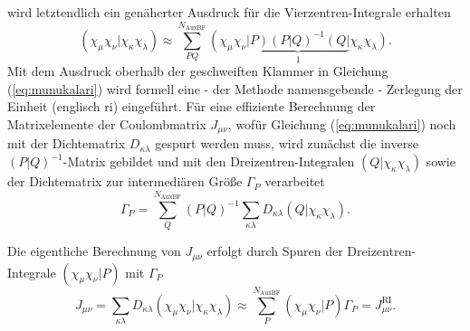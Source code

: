 	wird letztendlich ein genäherter Ausdruck für die Vierzentren-Integrale erhalten	
	\begin{equation}\label{eq:munukalari}
	\left(\chi_\mu\chi_\nu\vert\chi_\kappa\chi_\lambda\right)\approx\sum_{PQ}^{N_{\textrm{AuxBF}}}\left(\chi_\mu\chi_\nu\right.\underbrace{\left.\vert P\right)\left(P\vert Q\right)^{-1}\left(Q\vert\right.}_{1}\left.\chi_\kappa\chi_\lambda\right).		
	\end{equation}
	Mit dem Ausdruck oberhalb der geschweiften Klammer in Gleichung (\ref{eq:munukalari}) wird formell eine - der Methode namensgebende - Zerlegung der Einheit (englisch \acf{ri}) eingeführt.
	Für eine effiziente Berechnung der Matrixelemente der Coulombmatrix $J_{\mu\nu}$, wofür Gleichung (\ref{eq:munukalari}) noch mit der Dichtematrix $D_{\kappa\lambda}$ gespurt werden muss, wird zunächst die inverse $\left(P\vert Q\right)^{-1}$-Matrix gebildet und mit den Dreizentren-Integralen $\left(Q\vert\chi_\kappa\chi_\lambda\right)$ sowie der Dichtematrix zur intermediären Größe $\Gamma_P$ verarbeitet
	\begin{equation}
	\Gamma_P=\sum_Q^{N_{\textrm{AuxBF}}}\left(P\vert Q\right)^{-1}\sum_{\kappa\lambda}D_{\kappa\lambda}\left(Q\vert\chi_\kappa\chi_\lambda\right).
	\end{equation}
	
	Die eigentliche Berechnung von $J_{\mu\nu}$ erfolgt durch Spuren der Dreizentren-Integrale $\left(\chi_\mu\chi_\nu\vert P\right)$ mit $\Gamma_P$
	\begin{equation}
	J_{\mu\nu}=\sum_{\kappa\lambda}D_{\kappa\lambda}\left(\chi_\mu\chi_\nu\vert\chi_\kappa\chi_\lambda\right)\approx\sum_{P}^{N_{\textrm{AuxBF}}}\left(\chi_\mu\chi_\nu\vert P\right)\Gamma_P=J_{\mu\nu}^{\textrm{RI}}.
	\end{equation}
	
